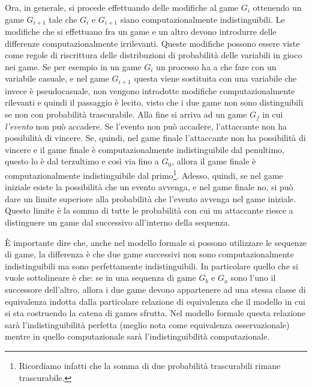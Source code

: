 \documentclass[a4paper,openright,twoside,12pt]{report}
\begin{document}
Ora, in generale, si procede effettuando delle modifiche al game $G_i$ ottenendo un game $G_{i+1}$ 
tale che $G_i$ e $G_{i+1}$ siano computazionalmente indistinguibili. Le modifiche che si effettuano fra un game e un altro devono introdurre delle differenze computazionalmente irrilevanti.
Queste modifiche possono essere viste come regole di riscrittura delle distribuzioni di probabilit\`a delle variabili in gioco nei game.
Se per esempio in un game $G_i$ un processo ha a che fare con un variabile casuale, e nel game $G_{i+1}$ questa viene sostituita con una variabile che invece \`e pseudocasuale, non vengono introdotte
modifiche computazionalmente rilevanti e quindi il passaggio \`e lecito, visto che i due game non sono distinguibili se non con probabilit\`a trascurabile.
Alla fine si arriva ad un game $G_f$ in cui \emph{l'evento} non pu\`o accadere. Se l'evento non pu\`o accadere, l'attaccante non ha possibilit\`a di vincere. 
Se, quindi, nel game finale l'attaccante non ha possibilit\`a di vincere e il game finale
\`e computazionalmente indistinguibile dal penultimo, questo lo \`e dal terzultimo e cos\`i via fino a $G_0$, allora
il game finale \`e computazionalmente indistinguibile dal primo\footnote{Ricordiamo infatti che la somma di due probabilit\`a trascurabili rimane trascurabile.}. 
Adesso, quindi, se nel game iniziale esiste la possibilit\`a che un evento avvenga, e nel game finale no,
si pu\`o dare un limite superiore alla probabilit\`a che l'evento avvenga nel game iniziale. Questo limite \`e la somma di tutte le probabilit\`a con cui un attaccante riesce a distinguere un game dal successivo all'interno della sequenza.

\`E importante dire che, anche nel modello formale si possono utilizzare le sequenze di game, la differenza \`e che due game successivi non sono computazionalmente indistinguibili 
ma sono perfettamente indistinguibili. In particolare quello che si vuole sottolineare \`e che: se in una sequenza di game $G_b$ e $G_a$ sono l'uno il successore dell'altro, 
allora i due game 
devono appartenere ad una stessa classe di equivalenza indotta dalla particolare relazione di equivalenza che il modello in cui si sta costruendo la catena di games sfrutta.
Nel modello formale questa relazione sar\`a l'indistinguibilit\`a perfetta (meglio nota come equivalenza osservazionale) mentre in quello computazionale sar\`a 
l'indistinguibilit\`a computazionale.
\end{document}
